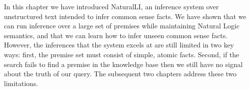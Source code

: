 In this chapter we have introduced NaturalLI, an inference system over
  unstructured text intended to infer common sense facts.
We have shown that we can run inference over a large set of premises
  while maintaining Natural Logic semantics, and that
  we can learn how to infer unseen common sense facts.
However, the inferences that the system excels at are still limited
  in two key ways: first, the premise set must consist of simple, atomic facts.
Second, if the search fails to find a premise in the knowledge base
  then we still have no signal about the truth of our query.
The subsequent two chapters address these two limitations.
